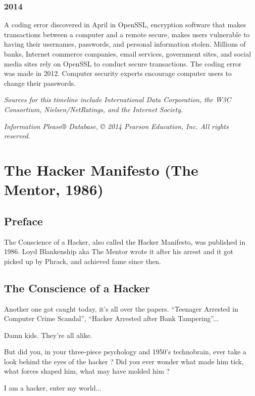 \documentclass[letterpaper,12pt,english]{sphinxmanual}
\begin{document}
\subsection{2014}
\label{network-timeline:id29}
A coding error discovered in April in OpenSSL, encryption software that makes transactions between a computer and a remote secure, makes users vulnerable to having their usernames, passwords, and personal information stolen. Millions of banks, Internet commerce companies, email services, government sites, and social media sites rely on OpenSSL to conduct secure transactions. The coding error was made in 2012. Computer security experts encourage computer users to change their passwords.

\emph{Sources for this timeline include International Data Corporation, the W3C Consortium, Nielsen/NetRatings, and the Internet Society.}

\emph{Information Please® Database, © 2014 Pearson Education, Inc. All rights reserved.}


\chapter{The Hacker Manifesto (The Mentor, 1986)}
\label{1986::doc}\label{1986:the-hacker-manifesto-the-mentor-1986}

\section{Preface}
\label{1986:preface}
The Conscience of a Hacker, also called the Hacker Manifesto, was published in 1986. Loyd Blankenship aka The Mentor wrote it after his arrest and it got picked up by Phrack, and achieved fame since then.


\section{The Conscience of a Hacker}
\label{1986:the-conscience-of-a-hacker}
Another one got caught today, it's all over the papers. ``Teenager Arrested in Computer Crime Scandal'', ``Hacker Arrested after Bank Tampering''...

Damn kids. They're all alike.

But did you, in your three-piece psychology and 1950's technobrain, ever take a look behind the eyes of the hacker ? Did you ever wonder what made him tick, what forces shaped him, what may have molded him ?

I am a hacker, enter my world...
\end{document}
